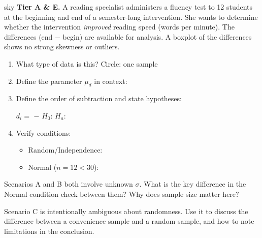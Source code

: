 \documentclass[10pt]{article}
\begin{document}
\begin{scenariobox}{sky}
\textbf{Tier A \& E.} \quad
A reading specialist administers a fluency test to 12 students at the beginning and end of a
semester-long intervention. She wants to determine whether the intervention \emph{improved}
reading speed (words per minute). The differences (end $-$ begin) are available for analysis.
A boxplot of the differences shows no strong skewness or outliers.

\begin{enumerate}[label=\alph*.]
  \item What type of data is this? Circle: \quad one sample \quad {}

  \item Define the parameter $\mu_d$ in context: 

  \item Define the order of subtraction and state hypotheses:

        $d_i = $  $-$  \qquad $H_0$:  \quad $H_a$: 

  \item Verify conditions:
        \begin{itemize}
          \item Random/Independence: 
          \item Normal ($n = 12 < 30$): 
        \end{itemize}
\end{enumerate}
\end{scenariobox}

\begin{reflectionbox}
Scenarios A and B both involve unknown $\sigma$. What is the key difference in the Normal
condition check between them? Why does sample size matter here?
\end{reflectionbox}

\begin{teachernote}
Scenario C is intentionally ambiguous about randomness. Use it to discuss the difference between
a convenience sample and a random sample, and how to note limitations in the conclusion.
\end{teachernote}
\end{document}
